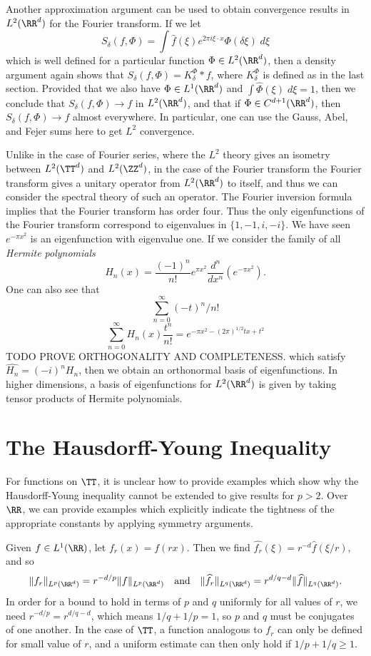 Another approximation argument can be used to obtain convergence results in $L^2(\RR^d)$ for the Fourier transform. If we let
%
\[ S_\delta(f,\Phi) = \int \widehat{f}(\xi) e^{2 \pi i \xi \cdot x} \Phi(\delta \xi)\; d\xi \]
%
which is well defined for a particular function $\Phi \in L^2(\RR^d)$, then a density argument again shows that $S_\delta(f,\Phi) = K_\delta^\Phi * f$, where $K_\delta^\Phi$ is defined as in the last section. Provided that we also have $\Phi \in L^1(\RR^d)$ and $\int \widehat{\Phi}(\xi)\; d\xi = 1$, then we conclude that $S_\delta(f,\Phi) \to f$ in $L^2(\RR^d)$, and that if $\Phi \in C^{d+1}(\RR^d)$, then $S_\delta(f,\Phi) \to f$ almost everywhere. In particular, one can use the Gauss, Abel, and Fejer sums here to get $L^2$ convergence.

Unlike in the case of Fourier series, where the $L^2$ theory gives an isometry between $L^2(\TT^d)$ and $L^2(\ZZ^d)$, in the case of the Fourier transform the Fourier transform gives a unitary operator from $L^2(\RR^d)$ to itself, and thus we can consider the spectral theory of such an operator. The Fourier inversion formula implies that the Fourier transform has order four. Thus the only eigenfunctions of the Fourier transform correspond to eigenvalues in $\{ 1, -1, i, -i \}$. We have seen $e^{- \pi x^2}$ is an eigenfunction with eigenvalue one. If we consider the family of all \emph{Hermite polynomials}
%
\[ H_n(x) = \frac{(-1)^n}{n!} e^{\pi x^2} \frac{d^n}{dx^n} \left( e^{- \pi x^2} \right). \]
%
One can also see that
%
\[ \sum_{n = 0}^\infty (-t)^n/n! \]
\[ \sum_{n = 0}^\infty H_n(x) \frac{t^n}{n!} = e^{- \pi x^2 - (2\pi)^{1/2} tx + t^2} \]
%
TODO PROVE ORTHOGONALITY AND COMPLETENESS. which satisfy $\widehat{H_n} = (-i)^n H_n$, then we obtain an orthonormal basis of eigenfunctions. In higher dimensions, a basis of eigenfunctions for $L^2(\RR^d)$ is given by taking tensor products of Hermite polynomials.


\section{The Hausdorff-Young Inequality}

For functions on $\TT$, it is unclear how to provide examples which show why the Hausdorff-Young inequality cannot be extended to give results for $p > 2$. Over $\RR$, we can provide examples which explicitly indicate the tightness of the appropriate constants by applying symmetry arguments.

\begin{example}
    Given $f \in L^1(\RR)$, let $f_r(x) = f(rx)$. Then we find $\widehat{f_r}(\xi) = r^{-d} \widehat{f}(\xi/r)$, and so
    \[ \| f_r \|_{L^p(\RR^d)} = r^{-d/p} \| f \|_{L^p(\RR^d)} \quad \text{and} \quad \| \widehat{f_r} \|_{L^q(\RR^d)} = r^{d/q-d} \| \widehat{f} \|_{L^q(\RR^d)}. \]
    In order for a bound to hold in terms of $p$ and $q$ uniformly for all values of $r$, we need $r^{-d/p} = r^{d/q-d}$, which means $1/q + 1/p = 1$, so $p$ and $q$ must be conjugates of one another. In the case of $\TT$, a function analogous to $f_r$ can only be defined for small value of $r$, and a uniform estimate can then only hold if $1/p + 1/q \geq 1$.
\end{example}

